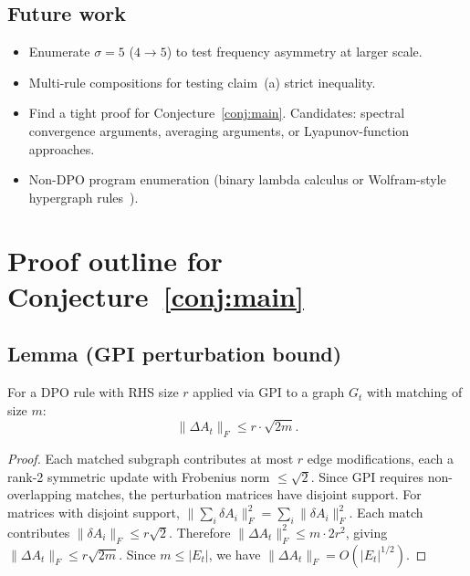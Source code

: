 \documentclass{../shared/primo}
\begin{document}
\subsection{Future work}

\begin{itemize}
\item Enumerate $\sigma = 5$ ($4 \to 5$) to test frequency asymmetry at larger scale.
\item Multi-rule compositions for testing claim~(a) strict inequality.
\item Find a tight proof for Conjecture~\ref{conj:main}. Candidates: spectral convergence arguments, averaging arguments, or Lyapunov-function approaches.
\item Non-DPO program enumeration (binary lambda calculus or Wolfram-style hypergraph rules~\cite{wolfram2020class,gorard2020relativistic}).
\end{itemize}


\appendix

\section{Proof outline for Conjecture~\ref{conj:main}}
\label{app:proof}

\subsection{Lemma (GPI perturbation bound)}

\begin{lemma}\label{lem:gpi}
For a DPO rule with RHS size $r$ applied via GPI to a graph $G_t$ with matching of size $m$:
\[
\|\Delta A_t\|_F \leq r \cdot \sqrt{2m}.
\]
\end{lemma}

\begin{proof}
Each matched subgraph contributes at most $r$ edge modifications, each a rank-2 symmetric update with Frobenius norm $\leq \sqrt{2}$. Since GPI requires non-overlapping matches, the perturbation matrices have disjoint support. For matrices with disjoint support, $\|\sum_i \delta A_i\|_F^2 = \sum_i \|\delta A_i\|_F^2$. Each match contributes $\|\delta A_i\|_F \leq r\sqrt{2}$. Therefore $\|\Delta A_t\|_F^2 \leq m \cdot 2r^2$, giving $\|\Delta A_t\|_F \leq r\sqrt{2m}$. Since $m \leq |E_t|$, we have $\|\Delta A_t\|_F = O(|E_t|^{1/2})$.
\end{proof}
\end{document}
